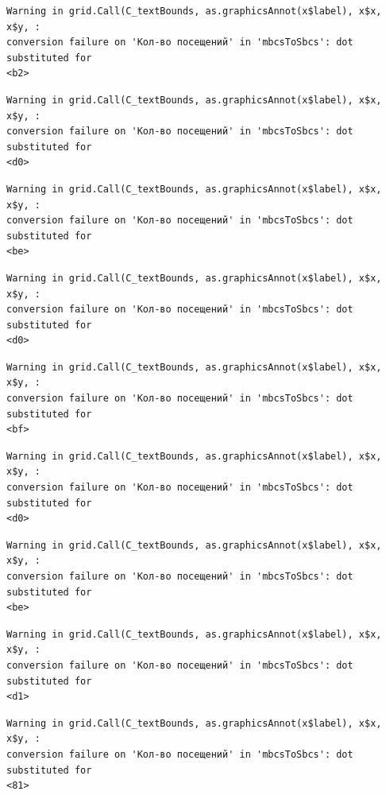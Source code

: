 \documentclass[
  letterpaper,
  DIV=11,
  numbers=noendperiod]{scrartcl}
\begin{document}
\begin{verbatim}
Warning in grid.Call(C_textBounds, as.graphicsAnnot(x$label), x$x, x$y, :
conversion failure on 'Кол-во посещений' in 'mbcsToSbcs': dot substituted for
<b2>
\end{verbatim}

\begin{verbatim}
Warning in grid.Call(C_textBounds, as.graphicsAnnot(x$label), x$x, x$y, :
conversion failure on 'Кол-во посещений' in 'mbcsToSbcs': dot substituted for
<d0>
\end{verbatim}

\begin{verbatim}
Warning in grid.Call(C_textBounds, as.graphicsAnnot(x$label), x$x, x$y, :
conversion failure on 'Кол-во посещений' in 'mbcsToSbcs': dot substituted for
<be>
\end{verbatim}

\begin{verbatim}
Warning in grid.Call(C_textBounds, as.graphicsAnnot(x$label), x$x, x$y, :
conversion failure on 'Кол-во посещений' in 'mbcsToSbcs': dot substituted for
<d0>
\end{verbatim}

\begin{verbatim}
Warning in grid.Call(C_textBounds, as.graphicsAnnot(x$label), x$x, x$y, :
conversion failure on 'Кол-во посещений' in 'mbcsToSbcs': dot substituted for
<bf>
\end{verbatim}

\begin{verbatim}
Warning in grid.Call(C_textBounds, as.graphicsAnnot(x$label), x$x, x$y, :
conversion failure on 'Кол-во посещений' in 'mbcsToSbcs': dot substituted for
<d0>
\end{verbatim}

\begin{verbatim}
Warning in grid.Call(C_textBounds, as.graphicsAnnot(x$label), x$x, x$y, :
conversion failure on 'Кол-во посещений' in 'mbcsToSbcs': dot substituted for
<be>
\end{verbatim}

\begin{verbatim}
Warning in grid.Call(C_textBounds, as.graphicsAnnot(x$label), x$x, x$y, :
conversion failure on 'Кол-во посещений' in 'mbcsToSbcs': dot substituted for
<d1>
\end{verbatim}

\begin{verbatim}
Warning in grid.Call(C_textBounds, as.graphicsAnnot(x$label), x$x, x$y, :
conversion failure on 'Кол-во посещений' in 'mbcsToSbcs': dot substituted for
<81>
\end{verbatim}
\end{document}
